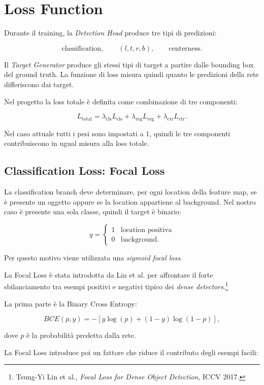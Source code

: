 \section{Loss Function}

Durante il training, la \textit{Detection Head} produce tre tipi di
predizioni:

\[
\text{classification},\qquad
(l,t,r,b),\qquad
\text{centerness}.
\]

Il \textit{Target Generator} produce gli stessi tipi di target a partire dalle
bounding box del ground truth. La funzione di loss misura quindi quanto le
predizioni della rete differiscono dai target.

Nel progetto la loss totale è definita come combinazione di tre componenti:

\[
L_{\text{total}}
=
\lambda_{\text{cls}}L_{\text{cls}}
+
\lambda_{\text{reg}}L_{\text{reg}}
+
\lambda_{\text{ctr}}L_{\text{ctr}}.
\]

Nel caso attuale tutti i pesi sono impostati a $1$, quindi le tre componenti
contribuiscono in ugual misura alla loss totale.

\subsection{Classification Loss: Focal Loss}

La classification branch deve determinare, per ogni location della feature
map, se è presente un oggetto oppure se la location appartiene al background.
Nel nostro caso è presente una sola classe, quindi il target è binario:

\[
y =
\begin{cases}
1 & \text{location positiva}\\
0 & \text{background}.
\end{cases}
\]

Per questo motivo viene utilizzata una \textit{sigmoid focal loss}.

La Focal Loss è stata introdotta da Lin et al. per affrontare il forte
sbilanciamento tra esempi positivi e negativi tipico dei \textit{dense
detectors}.\footnote{Tsung-Yi Lin et al., \textit{Focal Loss for Dense Object
Detection}, ICCV 2017.}

La prima parte è la Binary Cross Entropy:

\[
BCE(p,y)
=
-\left[
y\log(p)
+
(1-y)\log(1-p)
\right],
\]

dove $p$ è la probabilità predetta dalla rete.

La Focal Loss introduce poi un fattore che riduce il contributo degli esempi
facili:

